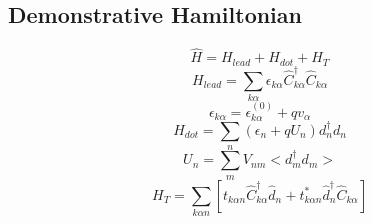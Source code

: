 \documentclass[aps,prb,superscriptaddress]{revtex4-2}
\begin{document}
\subsection{Demonstrative Hamiltonian}
\begin{equation}
\hat{H}=H_{l e a d}+H_{d o t}+H_{T}
\end{equation}
\begin{equation}
H_{l e a d}=\sum_{k \alpha} \epsilon_{k \alpha} \hat{C}_{k \alpha}^{\dagger} \hat{C}_{k \alpha}
\end{equation}
\begin{equation}
\epsilon_{k \alpha}=\epsilon_{k \alpha}^{(0)}+q v_{\alpha}
\end{equation}
\begin{equation}
H_{d o t}=\sum_{n}\left(\epsilon_{n}+q U_{n}\right) d_{n}^{\dagger} d_{n}
\end{equation}
\begin{equation}
U_{n}=\sum_{m} V_{n m}<d_{m}^{\dagger} d_{m}>
\end{equation}
\begin{equation}
H_{T}=\sum_{k \alpha n}\left[t_{k \alpha n} \hat{C}_{k \alpha}^{\dagger} \hat{d}_{n}+t_{k \alpha n}^{*} \hat{d}_{n}^{\dagger} \hat{C}_{k \alpha}\right]
\end{equation}
\end{document}
